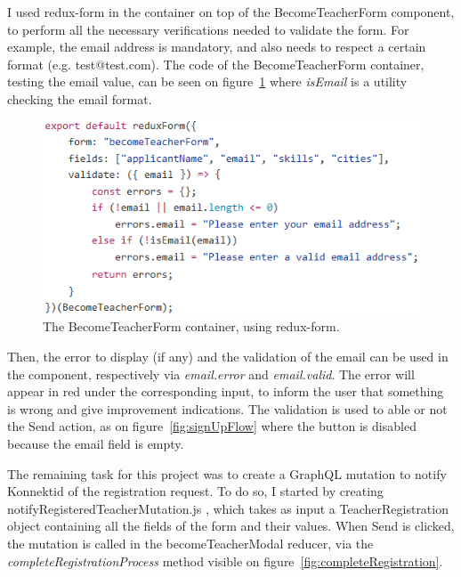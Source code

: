 I used redux-form in the container on top of the BecomeTeacherForm component, to perform all the necessary verifications needed to validate the form. For example, the email address is mandatory, and also needs to respect a certain format (e.g. test@test.com). The code of the BecomeTeacherForm container, testing the email value, can be seen on {\sc figure}~\ref{fig:reduxForm} where \textit{isEmail} is a utility checking the email format.

 \begin{figure}[H]
    \centering
    \includegraphics[scale=0.8]{figure/reduxForm.png}
    \caption{The BecomeTeacherForm container, using redux-form.}
    \label{fig:reduxForm}
\end{figure}

Then, the error to display (if any) and the validation of the email can be used in the component, respectively via \textit{email.error} and \textit{email.valid}. The error will appear in red under the corresponding input, to inform the user that something is wrong and give improvement indications. The validation is used to able or not the \guillemotleft{} Send \guillemotright{} action, as on {\sc figure}~\ref{fig:signUpFlow} where the button is disabled because the email field is empty.

The remaining task for this project was to create a GraphQL mutation to notify Konnektid of the registration request. To do so, I started by creating \guillemotleft{} notifyRegisteredTeacherMutation.js \guillemotright{}, which takes as input a \guillemotleft{} TeacherRegistration \guillemotright{} object containing all the fields of the form and their values. When \guillemotleft{} Send \guillemotright{} is clicked, the mutation is called in the \guillemotleft{} becomeTeacherModal \guillemotright{} reducer, via the \textit{completeRegistrationProcess} method visible on {\sc figure}~\ref{fig:completeRegistration}.

